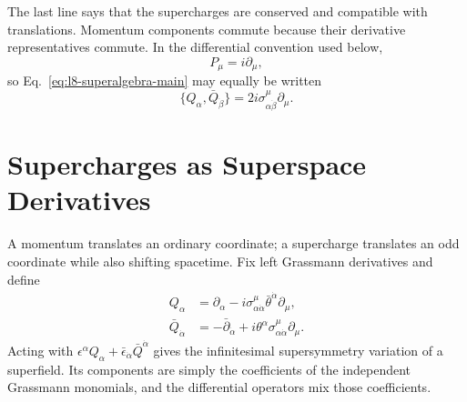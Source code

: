 The last line says that the supercharges are conserved and compatible with translations. Momentum components commute because their derivative representatives commute. In the differential convention used below,
\begin{equation}
P_\mu=i\partial_\mu,
\end{equation}
so Eq.~\eqref{eq:l8-superalgebra-main} may equally be written
\begin{equation}
\{Q_\alpha,\bar Q_{\dot\beta}\}
=2i\sigma^\mu_{\alpha\dot\beta}\partial_\mu.
\end{equation}

\section{Supercharges as Superspace Derivatives}

A momentum translates an ordinary coordinate; a supercharge translates an odd coordinate while also shifting spacetime. Fix left Grassmann derivatives and define
\begin{align}
Q_\alpha
&=\partial_\alpha
-i\sigma^\mu_{\alpha\dot\alpha}
\bar\theta^{\dot\alpha}\partial_\mu,
\label{eq:l8-Q}\\
\bar Q_{\dot\alpha}
&=-\bar\partial_{\dot\alpha}
+i\theta^\alpha\sigma^\mu_{\alpha\dot\alpha}\partial_\mu.
\label{eq:l8-Qbar}
\end{align}
Acting with \(\epsilon^\alpha Q_\alpha+
\bar\epsilon_{\dot\alpha}\bar Q^{\dot\alpha}\) gives the infinitesimal supersymmetry variation of a superfield. Its components are simply the coefficients of the independent Grassmann monomials, and the differential operators mix those coefficients.

\begin{classroomqa}
\end{classroomqa}

\begin{classroomqa}
\end{classroomqa}

